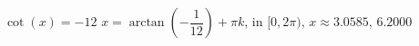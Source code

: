  {$\cot(x) = -12$}
{ $x = \arctan\left(-\dfrac{1}{12}\right) + \pi k$, in  $[0, 2\pi)$,  $x \approx 3.0585, \, 6.2000$}
